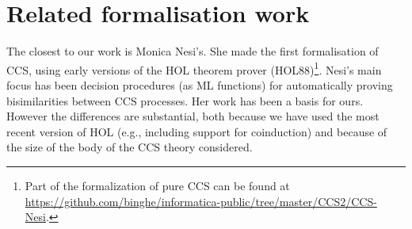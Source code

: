 \section{Related formalisation work}

The closest to our work is Monica Nesi's.
She made the first formalisation of CCS, using
early versions of the HOL theorem prover (HOL88)\footnote{Part of
 the formalization of pure CCS can be found at \url{https://github.com/binghe/informatica-public/tree/master/CCS2/CCS-Nesi}.}.
Nesi's  main focus has been 
 decision procedures (as ML functions) for
automatically proving bisimilarities between CCS
processes.%
Her work has been a basis for ours. However the differences are
substantial, both because we have used the most recent version of HOL
(e.g., including support for coinduction) and because of the size of
the body of the CCS theory considered. 



